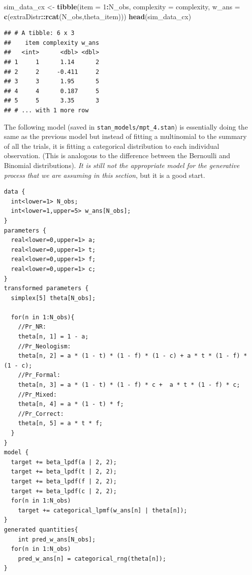 \documentclass[12pt,]{krantz}
\newenvironment{Shaded}{\begin{snugshade}}{\end{snugshade}}
\newcommand{\DataTypeTok}[1]{\textcolor[rgb]{0.13,0.29,0.53}{#1}}
\newcommand{\DecValTok}[1]{\textcolor[rgb]{0.00,0.00,0.81}{#1}}
\newcommand{\KeywordTok}[1]{\textcolor[rgb]{0.13,0.29,0.53}{\textbf{#1}}}
\newcommand{\NormalTok}[1]{#1}
\newcommand{\OperatorTok}[1]{\textcolor[rgb]{0.81,0.36,0.00}{\textbf{#1}}}
\newcommand{\StringTok}[1]{\textcolor[rgb]{0.31,0.60,0.02}{#1}}
\theoremstyle{definition}
\theoremstyle{definition}
\theoremstyle{definition}
\theoremstyle{remark}
\begin{document}
\begin{Shaded}
\begin{Highlighting}[]
\NormalTok{sim_data_cx <-}\StringTok{ }\KeywordTok{tibble}\NormalTok{(}\DataTypeTok{item =} \DecValTok{1}\OperatorTok{:}\NormalTok{N_obs,}
                      \DataTypeTok{complexity =}\NormalTok{ complexity,}
                      \DataTypeTok{w_ans =} \KeywordTok{c}\NormalTok{(extraDistr}\OperatorTok{::}\KeywordTok{rcat}\NormalTok{(N_obs,theta_item)))}
\KeywordTok{head}\NormalTok{(sim_data_cx)}
\end{Highlighting}
\end{Shaded}

\begin{verbatim}
## # A tibble: 6 x 3
##    item complexity w_ans
##   <int>      <dbl> <dbl>
## 1     1      1.14      2
## 2     2     -0.411     2
## 3     3      1.95      5
## 4     4      0.187     5
## 5     5      3.35      3
## # ... with 1 more row
\end{verbatim}

The following model (saved in \texttt{stan\_models/mpt\_4.stan}) is essentially doing the same as the previous model but instead of fitting a multinomial to the summary of all the trials, it is fitting a categorical distribution to each individual observation. (This is analogous to the difference between the Bernoulli and Binomial distributions). \emph{It is still not the appropriate model for the generative process that we are assuming in this section}, but it is a good start.

\begin{verbatim}
data {
  int<lower=1> N_obs;
  int<lower=1,upper=5> w_ans[N_obs];
}
parameters {
  real<lower=0,upper=1> a;
  real<lower=0,upper=1> t;
  real<lower=0,upper=1> f;
  real<lower=0,upper=1> c;
}
transformed parameters {
  simplex[5] theta[N_obs];

  for(n in 1:N_obs){
    //Pr_NR:
    theta[n, 1] = 1 - a;
    //Pr_Neologism:
    theta[n, 2] = a * (1 - t) * (1 - f) * (1 - c) + a * t * (1 - f) * (1 - c);
    //Pr_Formal:
    theta[n, 3] = a * (1 - t) * (1 - f) * c +  a * t * (1 - f) * c;
    //Pr_Mixed:
    theta[n, 4] = a * (1 - t) * f;
    //Pr_Correct:
    theta[n, 5] = a * t * f;
  }
}
model {
  target += beta_lpdf(a | 2, 2);
  target += beta_lpdf(t | 2, 2);
  target += beta_lpdf(f | 2, 2);
  target += beta_lpdf(c | 2, 2);
  for(n in 1:N_obs)
    target += categorical_lpmf(w_ans[n] | theta[n]);
}
generated quantities{
    int pred_w_ans[N_obs];
  for(n in 1:N_obs)
    pred_w_ans[n] = categorical_rng(theta[n]);
}
\end{verbatim}
\end{document}
